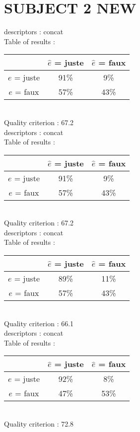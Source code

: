 \newpage
\section*{SUBJECT 2 NEW}
descriptors : concat \\
Table of results : \\
\begin{tabular}{|c|c|c|}
\hline				& $\hat{e}$ = juste & $\hat{e}$ = faux \\
\hline  $e$ = juste	&     91\%			&      9\%		\\
\hline  $e$ = faux	&     57\%			&     43\%		\\
\hline
\end{tabular}\\
Quality criterion :   67.2 \\

descriptors : concat \\
Table of results : \\
\begin{tabular}{|c|c|c|}
\hline				& $\hat{e}$ = juste & $\hat{e}$ = faux \\
\hline  $e$ = juste	&     91\%			&      9\%		\\
\hline  $e$ = faux	&     57\%			&     43\%		\\
\hline
\end{tabular}\\
Quality criterion :   67.2 \\

descriptors : concat \\
Table of results : \\
\begin{tabular}{|c|c|c|}
\hline				& $\hat{e}$ = juste & $\hat{e}$ = faux \\
\hline  $e$ = juste	&     89\%			&     11\%		\\
\hline  $e$ = faux	&     57\%			&     43\%		\\
\hline
\end{tabular}\\
Quality criterion :   66.1 \\

descriptors : concat \\
Table of results : \\
\begin{tabular}{|c|c|c|}
\hline				& $\hat{e}$ = juste & $\hat{e}$ = faux \\
\hline  $e$ = juste	&     92\%			&      8\%		\\
\hline  $e$ = faux	&     47\%			&     53\%		\\
\hline
\end{tabular}\\
Quality criterion :   72.8 \\

